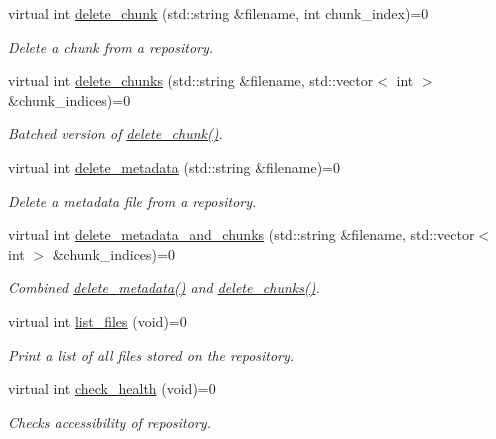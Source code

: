 \begin{DoxyCompactItemize}
virtual int \hyperlink{classStorage_ab49383c5d8f62c8e80fa10ba9f1d1e9a}{delete\-\_\-chunk} (std\-::string \&filename, int chunk\-\_\-index)=0
\begin{DoxyCompactList}\small\item\em \-Delete a chunk from a repository. \end{DoxyCompactList}\item 
virtual int \hyperlink{classStorage_a49753db906257b2d0514ae2d9926e713}{delete\-\_\-chunks} (std\-::string \&filename, std\-::vector$<$ int $>$ \&chunk\-\_\-indices)=0
\begin{DoxyCompactList}\small\item\em \-Batched version of \hyperlink{classStorage_ab49383c5d8f62c8e80fa10ba9f1d1e9a}{delete\-\_\-chunk()}. \end{DoxyCompactList}\item 
virtual int \hyperlink{classStorage_ac8c03f9affa684f4ab662bb34033b5c4}{delete\-\_\-metadata} (std\-::string \&filename)=0
\begin{DoxyCompactList}\small\item\em \-Delete a metadata file from a repository. \end{DoxyCompactList}\item 
virtual int \hyperlink{classStorage_a8716b136208b67fdbd2ce4fa15d37e59}{delete\-\_\-metadata\-\_\-and\-\_\-chunks} (std\-::string \&filename, std\-::vector$<$ int $>$ \&chunk\-\_\-indices)=0
\begin{DoxyCompactList}\small\item\em \-Combined \hyperlink{classStorage_ac8c03f9affa684f4ab662bb34033b5c4}{delete\-\_\-metadata()} and \hyperlink{classStorage_a49753db906257b2d0514ae2d9926e713}{delete\-\_\-chunks()}. \end{DoxyCompactList}\item 
virtual int \hyperlink{classStorage_a558507886c46dd57befbb737f0b50e31}{list\-\_\-files} (void)=0
\begin{DoxyCompactList}\small\item\em \-Print a list of all files stored on the repository. \end{DoxyCompactList}\item 
virtual int \hyperlink{classStorage_a8a2ecf3c5a17d9d913ade2c8649bc616}{check\-\_\-health} (void)=0
\begin{DoxyCompactList}\small\item\em \-Checks accessibility of repository. \end{DoxyCompactList}\end{DoxyCompactItemize}
